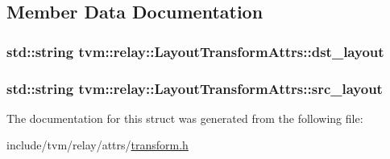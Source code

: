 \subsection{Member Data Documentation}
\subsubsection[{\texorpdfstring{dst\+\_\+layout}{dst_layout}}]{\setlength{\rightskip}{0pt plus 5cm}std\+::string tvm\+::relay\+::\+Layout\+Transform\+Attrs\+::dst\+\_\+layout}\hypertarget{structtvm_1_1relay_1_1LayoutTransformAttrs_ab7f5ccbb4c1f408da1f7a9d76c35fcf4}{}\label{structtvm_1_1relay_1_1LayoutTransformAttrs_ab7f5ccbb4c1f408da1f7a9d76c35fcf4}
\subsubsection[{\texorpdfstring{src\+\_\+layout}{src_layout}}]{\setlength{\rightskip}{0pt plus 5cm}std\+::string tvm\+::relay\+::\+Layout\+Transform\+Attrs\+::src\+\_\+layout}\hypertarget{structtvm_1_1relay_1_1LayoutTransformAttrs_ad0f658bf9e6ac538840fc71b1d312f3b}{}\label{structtvm_1_1relay_1_1LayoutTransformAttrs_ad0f658bf9e6ac538840fc71b1d312f3b}


The documentation for this struct was generated from the following file\+:\begin{DoxyCompactItemize}
\item 
include/tvm/relay/attrs/\hyperlink{include_2tvm_2relay_2attrs_2transform_8h}{transform.\+h}\end{DoxyCompactItemize}
